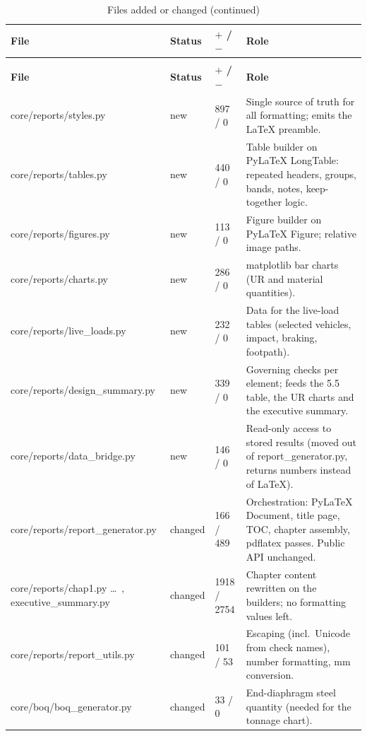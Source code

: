 \documentclass[10pt,a4paper]{article}
\newcommand{\file}[1]{{\footnotesize\ttfamily #1}}
\newcommand{\code}[1]{{\small\ttfamily #1}}
\begin{document}
\begin{longtable}{@{}L{0.31\textwidth}L{0.08\textwidth}L{0.10\textwidth}L{0.43\textwidth}@{}}
\caption{Files added or changed}\label{tab:files}\\
\toprule
\textbf{File} & \textbf{Status} & \textbf{$+$ / $-$} & \textbf{Role} \\
\midrule
\endfirsthead
\caption[]{Files added or changed (continued)}\\
\toprule
\textbf{File} & \textbf{Status} & \textbf{$+$ / $-$} & \textbf{Role} \\
\midrule
\endhead
\file{core/reports/styles.py} & new & 897 / 0 & Single source of truth for all formatting; emits the LaTeX preamble. \\
\file{core/reports/tables.py} & new & 440 / 0 & Table builder on PyLaTeX \code{LongTable}: repeated headers, groups, bands, notes, keep-together logic. \\
\file{core/reports/figures.py} & new & 113 / 0 & Figure builder on PyLaTeX \code{Figure}; relative image paths. \\
\file{core/reports/charts.py} & new & 286 / 0 & matplotlib bar charts (UR and material quantities). \\
\file{core/reports/live\_loads.py} & new & 232 / 0 & Data for the live-load tables (selected vehicles, impact, braking, footpath). \\
\file{core/reports/design\_summary.py} & new & 339 / 0 & Governing checks per element; feeds the 5.5 table, the UR charts and the executive summary. \\
\file{core/reports/data\_bridge.py} & new & 146 / 0 & Read-only access to stored results (moved out of \file{report\_generator.py}, returns numbers instead of LaTeX). \\
\file{core/reports/report\_generator.py} & changed & 166 / 489 & Orchestration: PyLaTeX \code{Document}, title page, TOC, chapter assembly, pdflatex passes. Public API unchanged. \\
\file{core/reports/chap1.py} \dots\ \newline \file{chap9.py}, \file{executive\_summary.py} & changed & 1918 / 2754 & Chapter content rewritten on the builders; no formatting values left. \\
\file{core/reports/report\_utils.py} & changed & 101 / 53 & Escaping (incl.\ Unicode from check names), number formatting, mm conversion. \\
\file{core/boq/boq\_generator.py} & changed & 33 / 0 & End-diaphragm steel quantity (needed for the tonnage chart). \\

\end{longtable}
\end{document}
